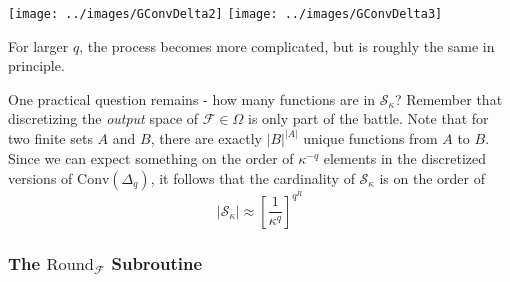 \begin{center}
\texttt{[image: ../images/GConvDelta2]} \qquad
\texttt{[image: ../images/GConvDelta3]}
\end{center}

For larger $q$, the process becomes more complicated, but is roughly the same in principle.

One practical question remains - how many functions are in $\mathcal{S}_\kappa$? Remember that discretizing the \textit{output} space of $\mathcal{F} \in \Omega$ is only part of the battle. Note that for two finite sets $A$ and $B$, there are exactly $|B|^{|A|}$ unique functions from $A$ to $B$. Since we can expect something on the order of $\kappa^{-q}$ elements in the discretized versions of $\text{Conv}(\Delta_q)$, it follows that the cardinality of $\mathcal{S}_\kappa$ is on the order of
\begin{equation}
|\mathcal{S}_\kappa| \approx \left[\frac{1}{\kappa^q}\right]^{q^R}
\end{equation}

\subsubsection{The $\text{Round}_{\mathcal{F}}$ Subroutine}

